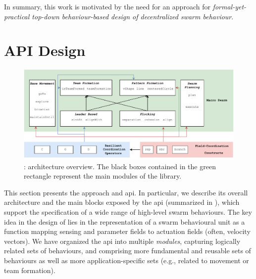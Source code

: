In summary,
 this work is motivated by the need for an
 approach for \emph{formal-yet-practical top-down behaviour-based design of decentralized swarm behaviour}.

\section{API Design}
\label{coordination2023-macro:sec:contrib}

\begin{figure}[t]
  \includegraphics[width=\textwidth]{papers/coordination2023-macro/images/architecture.drawio.pdf}
  \caption[\MacroSwarm{}: architecture overview.]{\MacroSwarm{}: architecture overview. 
  The black boxes contained in the green rectangle 
  represent the main modules of the library.
  }\label{coordination2023-macro:fig:architecture}
\end{figure}
This section presents the \MacroSwarm{} approach and \ac{api}.
%
In particular, we describe its overall architecture and the main blocks exposed by the \ac{api}
 (summarized in ), 
 which support the specification of a wide range of high-level swarm behaviours. 
%
The key idea in the design of \MacroSwarm{}  
 lies in the representation of a swarm behavioural unit 
 as a function mapping sensing and parameter fields 
 to actuation fields (often, velocity vectors).
%
We have organized the \ac{api}
 into multiple \emph{modules},
 capturing logically related sets of behaviours,
 and
 comprising more fundamental and reusable sets of behaviours
 as well as more application-specific sets (e.g., related to movement or team formation).

